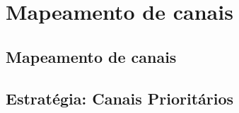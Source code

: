 \section{Mapeamento de canais}


\subsection{Mapeamento de canais}


\subsection{Estratégia: Canais Prioritários}
